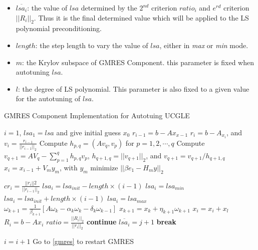 \begin{itemize}
	\item $\overline{lsa_{i}}$: the value of $lsa$ determined by the $2^{nd}$ criterion $ratio_i$ and $e^{rd}$ criterion $||R_i||_2$. Thus it is the final determined value which will be applied to the LS polynomial preconditioning.
	\item $length$: the step length to vary the value of $lsa$, either in \textit{max} or  \textit{min} mode.
	\item $m$: the Krylov subspace of GMRES Component. this parameter is fixed when autotuning $lsa$.
	\item $l$: the degree of LS polynomial. This parameter is also fixed to a given value for the autotuning of $lsa$.
\end{itemize}

\begin{algorithm}[htbp]{}
	\caption{GMRES Component Implementation for Autotuing UCGLE}   
	\label{alg:ucgle-autotuning}   
	\begin{algorithmic}[1]
		\State $i=1$, $lsa_1 = lsa$ and give initial guess $x_0$
		\State $r_{i-1} = b - Ax_{x-1}$     \label{gmres}
		\State $r_i = b - A_{x_i}$, and $v_i = \frac{r_{i-1}}{||r_{i-1}||_2}$
		\State Compute $h_{p,q}=(Av_q, v_p)$ for $p = 1, 2, \cdots, q$
		\State Compute  $v_{q+1} = AV_q - \sum_{p =1}^{q}h_{p,q}v_p$,  $h_{q+1,q} = ||v_{q+1}||_2$, and $v_{q+1} = v_{q+1}/h_{q+1,q}$
		\EndFor
		\State $x_i = x_{i-1}+V_my_m$, with $y_m$ minimize $||\beta e_1 - H_my||_2$
		
		
		\State $cr_i=\frac{||r_i||2}{||r_{i-1}||_2}$
		\State $lsa_i = lsa_{init} - length \times (i - 1)$
		\State $lsa_i =  lsa_{min}$
		\EndIf
		\EndCase
		\State $lsa_i = lsa_{init} + length \times (i - 1)$
		\State $lsa_i =  lsa_{max}$
		\EndIf 
		\EndCase
		\EndSwitch
		\EndIf
		\EndIf
		 \label{lsastart}
		\State $\omega_{k+1}=\frac{1}{\beta_{k+1}}[A\omega_k-\alpha_k\omega_k-\delta_k\omega_{k-1}]$
		\State $x_{k+1}=x_k+\eta_{k+1}\omega_{k+1}$
		\EndFor 
		\State $x_i = x_i + x_l$
		\State $R_i = b - Ax_i$
		\State  $ratio=\frac{||R_i||_2}{||r_{i}||_2}$
		\State \textbf{continue}
		\Else
		\State $\overline{lsa_{i}}= j + 1$
		\State \textbf{break}
		\EndIf 
		\EndFor \label{lsaend}
		
		\EndIf
		
		\State $i = i + 1$
		\State Go to \ref{gmres} to restart GMRES
		\EndWhile
		\EndFunction
	\end{algorithmic}  
\end{algorithm}

